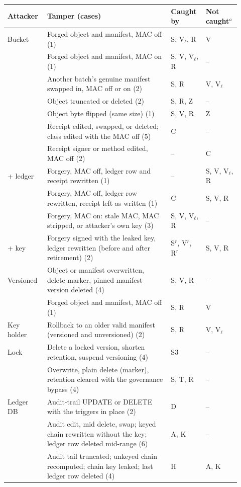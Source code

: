 
\begin{tabular}{@{}p{0.14\linewidth}p{0.5\linewidth}p{0.14\linewidth}p{0.14\linewidth}@{}}
\toprule
Attacker & Tamper (cases) & Caught by & Not caught$^a$ \\
\midrule
Bucket & Forged object and manifest, MAC off (1) & S, V$_\ell$, R & V \\
 & Forged object and manifest, MAC on (1) & S, V, V$_\ell$, R & -- \\
 & Another batch's genuine manifest swapped in, MAC off or on (2) & S, R & V, V$_\ell$ \\
 & Object truncated or deleted (2) & S, R, Z & -- \\
 & Object byte flipped (same size) (1) & S, V, R & Z \\
 & Receipt edited, swapped, or deleted; class edited with the MAC off (5) & C & -- \\
 & Receipt signer or method edited, MAC off (2) & -- & C \\
\addlinespace[1pt]
+ ledger & Forgery, MAC off, ledger row and receipt rewritten (1) & -- & S, V, V$_\ell$, R \\
 & Forgery, MAC off, ledger row rewritten, receipt left as written (1) & C & S, V, R \\
 & Forgery, MAC on: stale MAC, MAC stripped, or attacker's own key (3) & S, V, V$_\ell$, R & -- \\
\addlinespace[1pt]
+ key & Forgery signed with the leaked key, ledger rewritten (before and after retirement) (2) & S$^r$, V$^r$, R$^r$ & S, V, R \\
\addlinespace[1pt]
Versioned & Object or manifest overwritten, delete marker, pinned manifest version deleted (4) & S, V, R & -- \\
 & Forged object and manifest, MAC off (1) & S, R & V \\
\addlinespace[1pt]
Key holder & Rollback to an older valid manifest (versioned and unversioned) (2) & S, R & V, V$_\ell$ \\
\addlinespace[1pt]
Lock & Delete a locked version, shorten retention, suspend versioning (4) & S3 & -- \\
 & Overwrite, plain delete (marker), retention cleared with the governance bypass (4) & S, T, R & -- \\
\addlinespace[1pt]
Ledger DB & Audit-trail UPDATE or DELETE with the triggers in place (2) & D & -- \\
 & Audit edit, mid delete, swap; keyed chain rewritten without the key; ledger row deleted mid-range (6) & A, K & -- \\
 & Audit tail truncated; unkeyed chain recomputed; chain key leaked; last ledger row deleted (4) & H & A, K \\
\bottomrule
\end{tabular}
